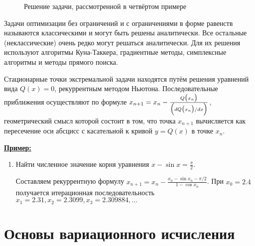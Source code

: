 \documentclass[preprint,russian,a5paper,10pt,twoside,mediummath]{ncc}
\newcommand{\ExampleMy}{\vspace{\baselineskip}\textbf{\underline{Пример:}}}
\begin{document}
\begin{figure}[ht] \centering
{}
\footnotesize \caption{Решение задачи, рассмотренной в четвёртом примере\label{fig:extremum:fourth_example}}
\end{figure}

Задачи оптимизации без ограничений и с ограничениями в форме равенств называются классическими и могут быть решены аналитически. Все остальные (неклассические) очень редко могут решаться аналитически. Для их решения используют алгоритмы Куна-Таккера, градиентные методы, симплексные алгоритмы и методы прямого поиска.

Стационарные точки экстремальной задачи находятся путём решения уравнений вида $ Q(x) = 0 $, рекуррентным методом Ньютона. Последовательные приближения осуществляют по формуле $ x_{n+1} = x_n - \frac{ Q \bigl( x_n \bigr) }{ \Bigl(  dQ \bigl( x_n \bigr) / dx \Bigr) } $, геометрический смысл которой состоит в том, что точка $ x_{n+1} $ вычисляется как пересечение оси абсцисс с касательной к кривой $ y = Q(x) $ в точке $ x_n $.

\ExampleMy
\begin{enumerate}[resume]
\item Найти численное значение корня уравнения $ x - \sin x = \frac{ \pi }{2} $.

Составляем рекуррентную формулу $ x_{n+1} = x_n - \frac{ x_n - \sin x_n - \pi/2}{ 1 - \cos x_n } $. При ${{x}_{0}}=2.4$ получается итерационная последовательность $ x_1 = 2.31, x_2 = 2.3099, x_3 = 2.309884, \ldots $ 
\end{enumerate}


\clearpage
\section{Основы вариационного исчисления\label{variations}}
\end{document}
